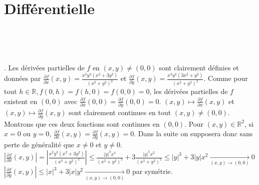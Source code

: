 \documentclass{report}
\begin{document}
\newpage
\section{Différentielle}

\subsection{} \noindent{}\\ 
\\ 
\\
. Les dérivées partielles de $f$ en $(x,y)\neq (0,0)$ sont clairement définies et données par $\frac{\partial f}{\partial x}(x,y)=\frac{x^2 y^3 \left(x^2+3 y^2\right)}{\left(x^2+y^2\right)^2}$ et $\frac{\partial f}{\partial y}(x,y)= \frac{x^3 y^2 \left(3 x^2+y^2\right)}{\left(x^2+y^2\right)^2}$. 
\newline
Comme pour tout $h\in \mathbb R, f(0,h)=f(h,0)=f(0,0)=0$, les dérivées partielles de $f$ existent en $(0,0)$ avec $\frac{\partial f}{\partial x}(0,0)=\frac{\partial f}{\partial y}(0,0)=0$.\newline
\newline
$(x,y)\mapsto \frac{\partial f}{\partial x}(x,y)$ et $(x,y)\mapsto \frac{\partial f}{\partial y}(x,y)$ sont clairement continues en tout $(x,y)\neq (0,0)$.
Montrons que ces deux fonctions sont continues en $(0,0)$.\newline
Pour $(x,y)\in \mathbb R^2$, si $x=0$ ou $y=0$, $\frac{\partial f}{\partial x}(x,y)=\frac{\partial f}{\partial y}(x,y)=0$. Dans la suite on supposera donc sans perte de généralité que $x\neq 0$ et $y\neq 0$.\newline
$\left| \frac{\partial f}{\partial x}(x,y)\right| =\left|\frac{x^2 y^3 \left(x^2+3 y^2\right)}{\left(x^2+y^2\right)^2}\right|\leq \frac{|y|^3x^4}{(x^2+y^2)^2} + 3\frac{|y|^5x^2}{(x^2+y^2)^2}\leq |y|^3+3|y|x^2 \xrightarrow[(x,y)\to (0,0)]{}0$\newline
$\left| \frac{\partial f}{\partial y}(x,y)\right| \leq |x|^3+3|x|y^2 \xrightarrow[(x,y)\to (0,0)]{}0$ par symétrie.\newline
\end{document}
